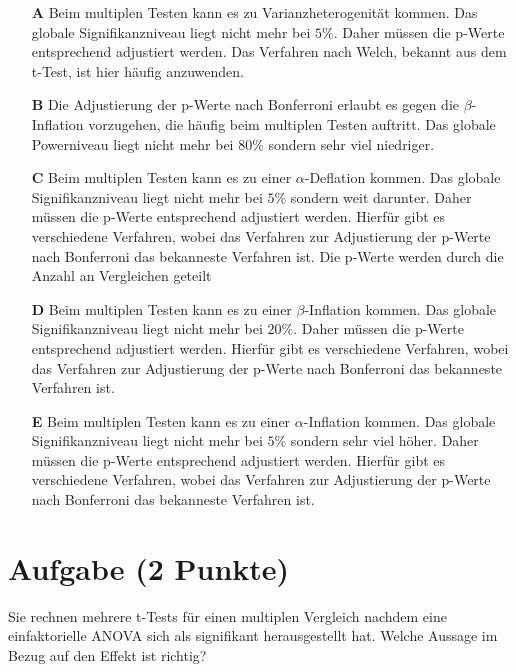 \documentclass[a4paper, 9pt]{scrartcl}\usepackage[]{graphicx}\usepackage[]{xcolor}
\begin{document}
\begin{enumerate}
\item [\textbf{A} \msquare] Beim multiplen Testen kann es zu Varianzheterogenität kommen. Das globale Signifikanzniveau liegt nicht mehr bei $5\%$. Daher müssen die p-Werte entsprechend adjustiert werden. Das Verfahren nach Welch, bekannt aus dem t-Test, ist hier häufig anzuwenden.
\item [\textbf{B} \msquare] Die Adjustierung der p-Werte nach Bonferroni erlaubt es gegen die $\beta$-Inflation vorzugehen, die häufig beim multiplen Testen auftritt. Das globale Powerniveau liegt nicht mehr bei $80\%$ sondern sehr viel niedriger.
\item [\textbf{C} \msquare] Beim multiplen Testen kann es zu einer $\alpha$-Deflation kommen. Das globale Signifikanzniveau liegt nicht mehr bei $5\%$ sondern weit darunter. Daher müssen die p-Werte entsprechend adjustiert werden. Hierfür gibt es verschiedene Verfahren, wobei das Verfahren zur Adjustierung der p-Werte nach Bonferroni das bekanneste Verfahren ist. Die p-Werte werden durch die Anzahl an Vergleichen geteilt
\item [\textbf{D} \msquare] Beim multiplen Testen kann es zu einer $\beta$-Inflation kommen. Das globale Signifikanzniveau liegt nicht mehr bei $20\%$. Daher müssen die p-Werte entsprechend adjustiert werden. Hierfür gibt es verschiedene Verfahren, wobei das Verfahren zur Adjustierung der p-Werte nach Bonferroni das bekanneste Verfahren ist.
\item [\textbf{E} \msquare] Beim multiplen Testen kann es zu einer $\alpha$-Inflation kommen. Das globale Signifikanzniveau liegt nicht mehr bei $5\%$ sondern sehr viel höher. Daher müssen die p-Werte entsprechend adjustiert werden. Hierfür gibt es verschiedene Verfahren, wobei das Verfahren zur Adjustierung der p-Werte nach Bonferroni das bekanneste Verfahren ist.
\end{enumerate}

\section{Aufgabe \hfill (2 Punkte)}




Sie rechnen mehrere t-Tests für einen multiplen Vergleich nachdem eine einfaktorielle ANOVA sich als signifikant herausgestellt hat. Welche Aussage im Bezug auf den Effekt ist richtig? 
\end{document}
